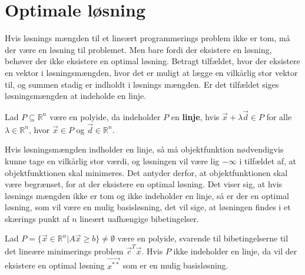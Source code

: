 \section{Optimale løsning}
\label{sec:eksistens}
Hvis løsnings mængden til et lineært programmerings problem ikke er tom, må der være en løsning til problemet.
Men bare fordi der eksistere en løsning, behøver der ikke eksistere en optimal løsning. 
Betragt tilfældet, hvor der eksistere en vektor i løsningsmængden, hvor det er muligt at lægge en vilkårlig stor vektor til, og summen stadig er indholdt i løsnings mængden.
Er det tilfældet siges løsningsmængden at indeholde en linje.
\begin{defn}[Linje]
Lad $P\subseteq \mathds{R}^n $ være en polyide, da indeholder $P$ en \textbf{linje}, hvis $\vec{x}+\lambda\vec{d} \in P$ for alle $\lambda \in \mathds{R}^n$, hvor $\vec{x}\in P$ og $\vec{d} \in \mathds{R}^n$.
\end{defn}
Hvis løsningsmængden indholder en linje, så må objektfunktion nødvendigvis kunne tage en vilkårlig stor værdi, og løsningen vil være lig $-\infty$ i tilfældet af, at objektfunktionen skal minimeres. 
Det antyder derfor, at objektfunktionen skal være begrænset, for at der eksistere en optimal løsning.
Det viser sig, at hvis løsnings mængden ikke er tom og ikke indeholder en linje, så er der en optimal løsning, som vil være en mulig basisløsning, det vil sige, at løsningen findes i et skærings punkt af $n$ lineært uafhængige bibetingelser.
\begin{stn}
Lad $P=\{\vec{x} \in \mathds{R}^n| A \vec{x} \geq b \} \neq \emptyset$ være en polyide, svarende til bibetingelserne til det lineære minimerings problem $\vec{c}^T\vec{x}$. Hvis $P$ ikke indeholder en linje, da vil der eksistere en optimal løsning $\vec{x^{**}}$ som er en mulig basisløsning.
\label{stn:eksistens}
\end{stn}
